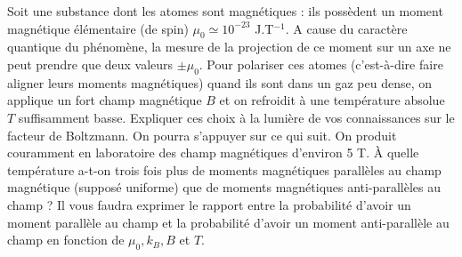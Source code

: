 Soit une substance dont les atomes sont magnétiques : ils possèdent un moment magnétique élémentaire (de spin) $\mu_0 \simeq 10^{-23}$ J.T$^{-1}$. A cause du caractère quantique du phénomène, la mesure de la projection de ce moment sur un axe ne peut prendre que deux valeurs $\pm \mu_0$. Pour polariser ces atomes (c'est-à-dire faire aligner leurs moments magnétiques) quand ils sont dans un gaz peu dense, on applique un fort champ magnétique $B$ et on refroidit à une température absolue $T$ suffisamment basse. Expliquer ces choix à la lumière de vos connaissances sur le facteur de Boltzmann. On pourra s'appuyer sur ce qui suit.
On produit couramment en laboratoire des champ magnétiques d'environ  5 T. \`A quelle température a-t-on trois fois plus de moments magnétiques parallèles au champ magnétique (supposé uniforme) que de moments magnétiques anti-parallèles au champ ? Il vous faudra exprimer le rapport entre la probabilité d'avoir un moment parallèle au champ et la probabilité d'avoir un moment anti-parallèle au champ en fonction de $\mu_0, k_B, B$ et $T$.
